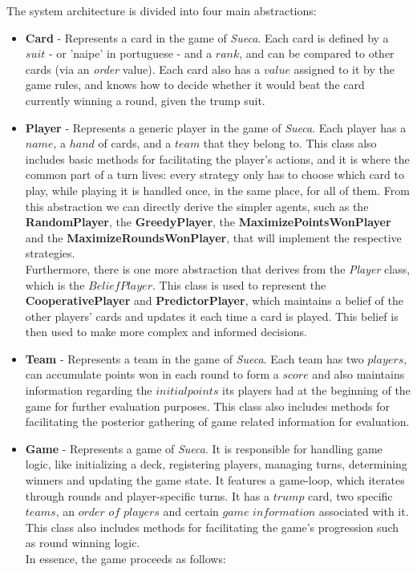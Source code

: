 \documentclass[sigconf]{acmart}
\begin{document}
The system architecture is divided into four main abstractions:\\

\begin{itemize}
  \item \textbf{Card} - Represents a card in the game of \textit{Sueca}. Each card is defined by a $suit$ - or 'naipe' in portuguese - and a $rank$, and can be compared to other cards (via an \textit{order} value). Each card also has a $value$ assigned to it by the game rules, and knows how to decide whether it would beat the card currently winning a round, given the trump suit.\\

  \item \textbf{Player} - Represents a generic player in the game of \textit{Sueca}. Each player has a $name$, a $hand$ of cards, and a $team$ that they belong to. This class also includes basic methods for facilitating the player's actions, and it is where the common part of a turn lives: every strategy only has to choose which card to play, while playing it is handled once, in the same place, for all of them. From this abstraction we can directly derive the simpler agents, such as the \textbf{RandomPlayer}, the \textbf{GreedyPlayer}, the \textbf{MaximizePointsWonPlayer} and the \textbf{MaximizeRoundsWonPlayer}, that will implement the respective strategies.\\

  Furthermore, there is one more abstraction that derives from the \textit{Player} class, which is the $BeliefPlayer$. This class is used to represent the \textbf{CooperativePlayer} and \textbf{PredictorPlayer}, which maintains a belief of the other players' cards and updates it each time a card is played. This belief is then used to make more complex and informed decisions.\\

  \item \textbf{Team} - Represents a team in the game of \textit{Sueca}. Each team has two $players$, can accumulate points won in each round to form a $score$ and also maintains information regarding the $initial points$ its players had at the beginning of the game for further evaluation purposes. This class also includes methods for facilitating the posterior gathering of game related information for evaluation.\\

  \item \textbf{Game} - Represents a game of \textit{Sueca}. It is responsible for handling game logic, like initializing a deck, registering players, managing turns, determining winners and updating the game state. It features a game-loop, which iterates through rounds and player-specific turns. It has a $trump$ card, two specific $teams$, an $order$ $of$ $players$ and certain $game$ $information$ associated with it. This class also includes methods for facilitating the game's progression such as round winning logic.\\
  In essence, the game proceeds as follows:\\


\end{itemize}
\end{document}
